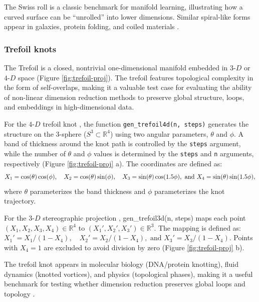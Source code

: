 The Swiss roll is a classic benchmark for manifold learning, illustrating how a curved surface can be ``unrolled'' into lower dimensions. Similar spiral-like forms appear in galaxies, protein folding, and coiled materials \citep{dimitris2002}.

\subsubsection{Trefoil knots}\label{trefoil-knots}

The Trefoil is a closed, nontrivial one-dimensional manifold embedded in \(3\text{-}D\) or \(4\text{-}D\) space (Figure \ref{fig:trefoil-proj}). The trefoil features topological complexity in the form of self-overlaps, making it a valuable test case for evaluating the ability of non-linear dimension reduction methods to preserve global structure, loops, and embeddings in high-dimensional data.

For the \(4\text{-}D\) trefoil knot \citep{lickorish1997, rolfsen2003}, the function \texttt{gen\_trefoil4d(n,\ steps)} generates the structure on the \(3\)-sphere (\(S^3 \subset \mathbb{R}^4\)) using two angular parameters, \(\theta\) and \(\phi\). A band of thickness around the knot path is controlled by the \texttt{steps} argument, while the number of \(\theta\) and \(\phi\) values is determined by the \texttt{steps} and \texttt{n} arguments, respectively (Figure \ref{fig:trefoil-proj} a). The coordinates are defined as: \[X_1 = \cos(\theta) \cos(\phi), \quad X_2 = \cos(\theta) \sin(\phi), \\\quad X_3 = \sin(\theta) \cos(1.5 \phi),\text{ and }X_4 = \sin(\theta) \sin(1.5 \phi),\]where \(\theta\) parameterizes the band thickness and \(\phi\) parameterizes the knot trajectory.

For the \(3\text{-}D\) stereographic projection \citep{lickorish1997, rolfsen2003}, gen\_trefoil3d(n, steps) maps each point \((X_1, X_2, X_3, X_4) \in \mathbb{R}^4\) to \((X_1', X_2', X_3') \in \mathbb{R}^3\). The mapping is defined as: \(X_1' = X_1 / (1 - X_4), \quad X_2' = X_2 / (1 - X_4),\text{ and }X_3' = X_3 / (1 - X_4)\). Points with \(X_4 = 1\) are excluded to avoid division by zero (Figure \ref{fig:trefoil-proj} b).

The trefoil knot appears in molecular biology (DNA/protein knotting), fluid dynamics (knotted vortices), and physics (topological phases), making it a useful benchmark for testing whether dimension reduction preserves global loops and topology \citep{witten1986, arsuaga2002}.

